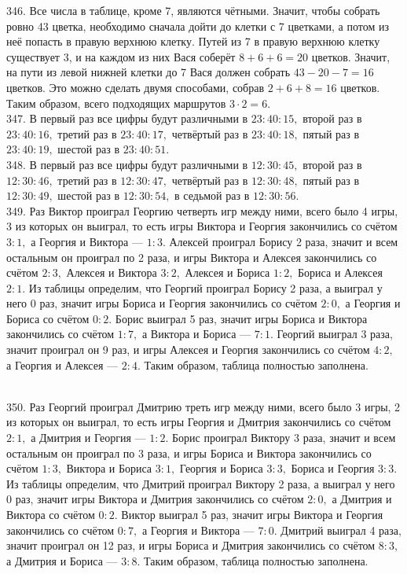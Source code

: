 346. Все числа в таблице, кроме 7, являются чётными. Значит, чтобы собрать ровно 43 цветка, необходимо сначала дойти до клетки с 7 цветками, а потом из неё попасть в правую верхнюю клетку. Путей из 7 в правую верхнюю клетку существует 3, и на каждом из них Вася соберёт $8+6+6=20$ цветков. Значит, на пути из левой нижней клетки до 7 Вася должен собрать $43-20-7=16$ цветков. Это можно сделать двумя способами, собрав $2+6+8=16$ цветков. Таким образом, всего подходящих маршрутов $3\cdot2=6.$\\
347. В первый раз все цифры будут различными в $23:40:15,$ второй раз в $23:40:16,$ третий раз в $23:40:17,$ четвёртый раз в $23:40:18,$ пятый раз в $23:40:19,$ шестой раз в $23:40:51.$\\
348. В первый раз все цифры будут различными в $12:30:45,$ второй раз в $12:30:46,$ третий раз в $12:30:47,$ четвёртый раз в $12:30:48,$ пятый раз в $12:30:49,$ шестой раз в $12:30:54,$ в седьмой раз в $12:30:56.$\\
349. Раз Виктор проиграл Георгию четверть игр между ними, всего было 4 игры, 3 из которых он выиграл, то есть игры Виктора и Георгия закончились со счётом $3:1,$ а Георгия и Виктора --- $1:3.$ Алексей проиграл Борису 2 раза, значит и всем остальным он проиграл по 2 раза, и игры Виктора и Алексея закончились со счётом $2:3,$ Алексея и Виктора $3:2,$ Алексея и Бориса $1:2,$ Бориса и Алексея $2:1.$ Из таблицы определим, что Георгий проиграл Борису 2 раза, а выиграл у него 0 раз, значит игры Бориса и Георгия закончились со счётом $2:0,$ а Георгия и Бориса со счётом $0:2.$ Борис выиграл 5 раз, значит игры Бориса и Виктора закончились со счётом $1:7,$ а Виктора и Бориса --- $7:1.$ Георгий выиграл 3 раза, значит проиграл он 9 раз, и игры Алексея и Георгия закончились со счётом $4:2,$ а Георгия и Алексея --- $2:4.$ Таким образом, таблица полностью заполнена.
\begin{figure}[ht!]
\end{figure}\\
350. Раз Георгий проиграл Дмитрию треть игр между ними, всего было 3 игры, 2 из которых он выиграл, то есть игры Георгия и Дмитрия закончились со счётом $2:1,$ а Дмитрия и Георгия --- $1:2.$ Борис проиграл Виктору 3 раза, значит и всем остальным он проиграл по 3 раза, и игры Бориса и Виктора закончились со счётом $1:3,$ Виктора и Бориса $3:1,$ Георгия и Бориса $3:3,$ Бориса и Георгия $3:3.$ Из таблицы определим, что Дмитрий проиграл Виктору 2 раза, а выиграл у него 0 раз, значит игры Виктора и Дмитрия закончились со счётом $2:0,$ а Дмитрия и Виктора со счётом $0:2.$ Виктор выиграл 5 раз, значит игры Виктора и Георгия закончились со счётом $0:7,$ а Георгия и Виктора --- $7:0.$ Дмитрий выиграл 4 раза, значит проиграл он 12 раз, и игры Бориса и Дмитрия закончились со счётом $8:3,$ а Дмитрия и Бориса --- $3:8.$ Таким образом, таблица полностью заполнена.\\
